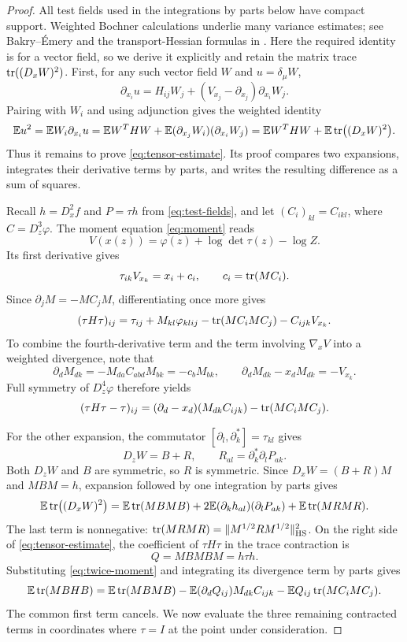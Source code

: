 \begin{proof}
All test fields used in the integrations by parts below have compact support.
Weighted Bochner calculations underlie many variance estimates; see
Bakry--\'Emery \cite[Proposition~3]{BakryEmery1985} and the
transport-Hessian formulas in \cite[Section~4.3]{KLR2026}.
Here the required identity is for a vector field, so we derive it
explicitly and retain the matrix trace $\operatorname{tr}((D_xW)^2)$.
First, for any such vector field $W$ and $u=\delta_\mu W$,
\[
 \partial_{x_i}u
 =H_{ij}W_j+(V_{x_j}-\partial_{x_j})\partial_{x_i}W_j.
\]
Pairing with $W_i$ and using adjunction gives the weighted identity
\begin{equation}\label{eq:bochner}
 \mathbb E u^2
 =\mathbb E W_i\partial_{x_i}u
 =\mathbb E W^THW
   +\mathbb E(\partial_{x_j}W_i)(\partial_{x_i}W_j)
 =\mathbb E W^THW+\mathbb E\operatorname{tr}\bigl((D_xW)^2\bigr).
\end{equation}
Thus it remains to prove \eqref{eq:tensor-estimate}.
Its proof compares two expansions, integrates their derivative terms
by parts, and writes the resulting difference as a sum of squares.

Recall $h=D_x^2f$ and $P=\tau h$ from \eqref{eq:test-fields}, and let
$(C_i)_{kl}=C_{ikl}$, where $C=D_z^3\varphi$.
The moment equation \eqref{eq:moment} reads
\[
 V(x(z))=\varphi(z)+\log\det\tau(z)-\log Z.
\]
Its first derivative gives
\[
 \tau_{ik}V_{x_k}=x_i+c_i,
 \qquad c_i=\operatorname{tr}(MC_i).
\]
Since $\partial_jM=-MC_jM$, differentiating once more gives
\[
 (\tau H\tau)_{ij}
 =\tau_{ij}+M_{kl}\varphi_{klij}
   -\operatorname{tr}(MC_iMC_j)-C_{ijk}V_{x_k}.
\]
To combine the fourth-derivative term and the term involving
$\nabla_xV$ into a weighted divergence, note that
\[
 \partial_dM_{dk}
 =-M_{da}C_{abd}M_{bk}=-c_bM_{bk},
 \qquad
 \partial_dM_{dk}-x_dM_{dk}=-V_{x_k}.
\]
Full symmetry of $D_z^4\varphi$ therefore yields
\begin{equation}\label{eq:twice-moment}
 (\tau H\tau-\tau)_{ij}
 =(\partial_d-x_d)(M_{dk}C_{ijk})
   -\operatorname{tr}(MC_iMC_j).
\end{equation}

For the other expansion, the commutator
$[\partial_l,\partial_k^*]=\tau_{kl}$ gives
\[
 D_zW=B+R,\qquad R_{al}=\partial_k^*\partial_lP_{ak}.
\]
Both $D_zW$ and $B$ are symmetric, so $R$ is symmetric.
Since $D_xW=(B+R)M$ and $MBM=h$, expansion followed by one
integration by parts gives
\begin{equation}\label{eq:trace-expansion}
 \mathbb E\operatorname{tr}\bigl((D_xW)^2\bigr)
 =\mathbb E\operatorname{tr}(MBMB)
  +2\mathbb E(\partial_kh_{al})(\partial_lP_{ak})
  +\mathbb E\operatorname{tr}(MRMR).
\end{equation}
The last term is nonnegative:
$\operatorname{tr}(MRMR)=\|M^{1/2}RM^{1/2}\|_{\mathrm{HS}}^2$.
On the right side of \eqref{eq:tensor-estimate}, the coefficient of
$\tau H\tau$ in the trace contraction is
\[
 Q=MBMBM=h\tau h.
\]
Substituting \eqref{eq:twice-moment} and integrating its divergence
term by parts gives
\begin{equation}\label{eq:H-expansion}
 \mathbb E\operatorname{tr}(MBHB)
 =\mathbb E\operatorname{tr}(MBMB)
   -\mathbb E(\partial_dQ_{ij})M_{dk}C_{ijk}
   -\mathbb E Q_{ij}\operatorname{tr}(MC_iMC_j).
\end{equation}
The common first term cancels.  We now evaluate the three remaining
contracted terms in coordinates where $\tau=I$ at the point under
consideration.


\end{proof}
